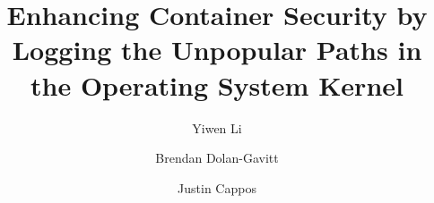 \documentclass[sigplan,screen]{acmart}
\begin{document}
\renewcommand\footnotetextcopyrightpermission[1]{} %
\pagestyle{plain} %
%
\title{Enhancing Container Security by Logging the Unpopular Paths in the Operating System Kernel}

\author{Yiwen Li}

\author{Brendan Dolan-Gavitt}

\author{Justin Cappos}

\maketitle










%


\end{document}
